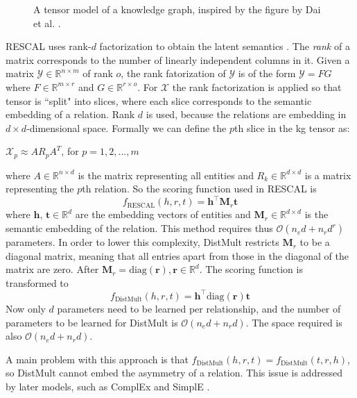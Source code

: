 \begin{figure}[htp]
    \centering
    
    \caption[A tensor model of a knowledge graph.]{A tensor model of a knowledge graph, inspired by the figure by Dai et al. \cite{dai2020survey}.}
    \label{tensor_model_fig}
\end{figure}

RESCAL uses rank-$d$ factorization to obtain the latent semantics \cite{RESCAL}. The \textit{rank} of a matrix corresponds to the number of linearly independent columns in it. Given a matrix $\mathcal{Y} \in \mathbb{R}^{n\times m}$ of rank $o$, the rank fatorization of $\mathcal{Y}$ is of the form $\mathcal{Y}=FG$ where $F\in \mathbb{R}^{m\times r}$ and $G\in \mathbb{R}^{r\times o}$. For $\mathcal{X}$ the rank factorization is applied so that tensor is ``split" into slices, where each slice corresponds to the semantic embedding of a relation. Rank $d$ is used, because the relations are embedding in $d \times d$-dimensional space. Formally we can define the $p$th slice in the \gls{kg} tensor as:
\begin{center}
 $\mathcal{X}_p \approx AR_p A^T$, for $p = 1,2,...,m$
\end{center}
where $A\in \mathbb{R}^{n\times d}$ is the matrix representing all entities and $R_k\in \mathbb{R}^{d\times d}$ is a matrix representing the $p$th relation.
So the scoring function used in RESCAL is
\[f_ {\text{RESCAL}}(h, r, t) =\textbf{h}^{\top}\textbf{M}_r\textbf{t}\]
where $\textbf{h, t}\in \mathbb{R}^{d}$ are the embedding vectors of entities and $\textbf{M}_r \in \mathbb{R}^{d\times d}$ is the semantic embedding of the relation.
This method requires thus $\mathcal{O}(n_ed + n_r d^r)$ parameters. In order to lower this complexity, DistMult restricts $\textbf{M}_r$ to be a diagonal matrix, meaning that all entries apart from those in the diagonal of the matrix are zero. After $\textbf{M}_r = \text{diag}(\textbf{r}), \textbf{r}\in\mathbb{R}^d$. The scoring function is transformed to
\[f_ {\text{DistMult}}(h, r, t) =\textbf{h}^{\top}\text{diag}(\textbf{r})\textbf{t}\]
Now only $d$ parameters need to be learned per relationship, and the number of parameters to be learned for DistMult is $\mathcal{O}(n_ed + n_r d)$. The space required is also $\mathcal{O}(n_ed + n_r d)$.

A main problem with this approach is that $f_ {\text{DistMult}}(h, r, t) = f_ {\text{DistMult}}(t, r, h)$, so DistMult cannot embed the asymmetry of a relation. This issue is addressed by later models, such as ComplEx \cite{complEx} and SimplE \cite{SimplE}.



